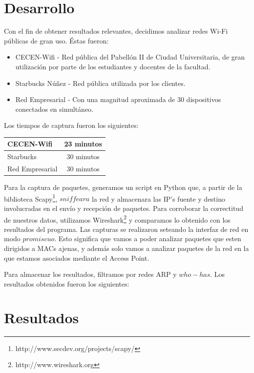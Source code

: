 \documentclass[10pt, a4paper]{article}
\begin{document}
\section{Desarrollo}

Con el fin de obtener resultados relevantes, decidimos analizar redes Wi-Fi públicas de gran uso. Éstas fueron:

\begin{itemize}
\item CECEN-Wifi - Red pública del Pabellón II de Ciudad Universitaria, de gran utilización por parte de los estudiantes y docentes de la facultad.
\item Starbucks Núñez - Red pública utilizada por los clientes.
\item Red Empresarial - Con una magnitud aproximada de 30 dispositivos conectados en simultáneo.
\end{itemize}

Los tiempos de captura fueron los siguientes:

\begin{center}
  \begin{tabular}{| l | c |}
    \hline
    CECEN-Wifi & 23 minutos\\ \hline
    Starbucks & 30 minutos\\ \hline
    Red Empresarial & 30 minutos\\
    \hline
  \end{tabular}
\end{center}

Para la captura de paquetes, generamos un script en Python que, a partir de la biblioteca Scapy\footnote{http://www.secdev.org/projects/scapy/}, $sniffeara$ la red y almacenara las IP's fuente y destino involucradas en el envío y recepción de paquetes. Para corroborar la correctitud de nuestros datos, utilizamos Wireshark\footnote{http://www.wireshark.org} y comparamos lo obtenido con los resultados del programa. 
Las capturas se realizaron seteando la interfaz de red en modo $promiscuo$. Esto significa que vamos a poder analizar paquetes que esten dirigidos a MACs ajenas, y además solo vamos a analizar paquetes de la red en la que estamos asociados mediante el Access Point.

Para almacenar los resultados, filtramos por redes ARP y $who-has$. Los resultados obtenidos fueron los siguientes:

\section{Resultados}
\end{document}
